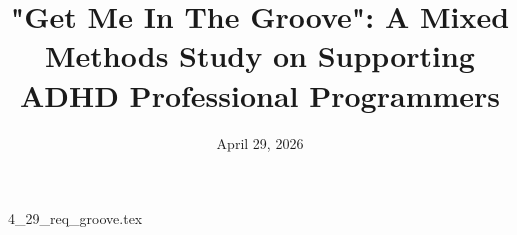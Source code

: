 \documentclass{article}      %
\title{"Get Me In The Groove": A Mixed Methods Study on Supporting ADHD Professional Programmers}  %
\date{April 29, 2026}
\begin{document}

\maketitle                   %



{4_29_req_groove.tex}
\end{document}
